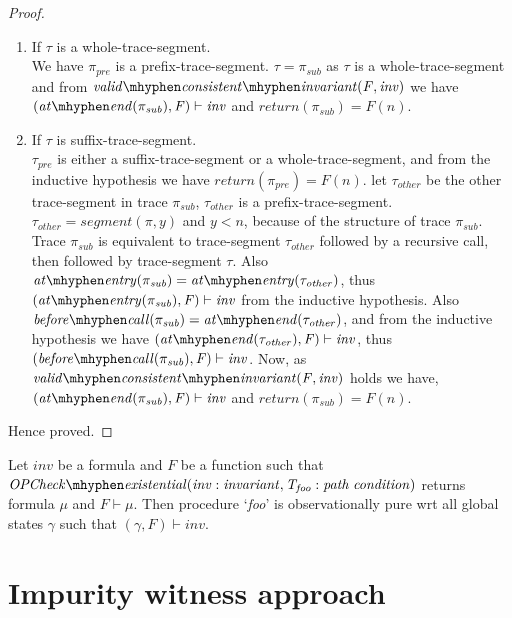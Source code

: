 \documentclass{llncs}
\newcommand{\foo}{\textit{foo}}
\newcommand{\trace}{\pi}
\newcommand{\inv}{\mathit{inv}}
\newcommand{\pathCondition}{\mathit{T_{\foo}}}
\newcommand{\OPCheckE}{\mathit{OPCheck \mhyphen existential}}
\newcommand{\mi}[1]{\mathit{#1}}
\newcommand{\F}{\mathit{F}}
\newcommand{\n}{\textit{n}}
\newcommand{\gstate}{\gamma}
\newcommand{\satisfies}{\vdash}
\newcommand{\formula}{\mu}
\newcommand{\vci}[2]{\mathit{valid \mhyphen consistent \mhyphen
    invariant(#1, #2)}}
\newcommand{\atEntry}[1]{\mathit{at \mhyphen entry(#1)}}
\newcommand{\beforeCall}[1]{\mathit{before \mhyphen call(#1)}}
\newcommand{\return}[1]{\mathit{return(#1)}}
\newcommand{\atEnd}[1]{\mathit{at \mhyphen end(#1)}}
\newcommand{\tSegment}{\tau}
\newcommand{\subTrace}{\pi_{sub}}
\newcommand{\segment}[2]{\mathit{segment(#1, #2)}} %
\begin{document}
\begin{proof}
\begin{enumerate}
  \item If $\tSegment$ is a whole-trace-segment.\\
    We have $\trace_{pre}$ is a prefix-trace-segment. $\tSegment =
    \subTrace$ as $\tSegment$ is a whole-trace-segment and from
    $\vci{\F}{\inv}$ we have \\$(\atEnd{\subTrace}, \F) \satisfies \inv$
    and $\return{\subTrace} = \F(\n)$.

  \item If $\tSegment$ is suffix-trace-segment.\\
    $\tSegment_{pre}$ is either a suffix-trace-segment or a
    whole-trace-segment, and from the
    inductive hypothesis we have $\return{\trace_{pre}} = \F(\n)$. let
    $\tSegment_{other}$ be the other trace-segment in trace
    $\subTrace$, $\tSegment_{other}$ is a
    prefix-trace-segment. $\tSegment_{other} = \segment{\trace}{y}$
    and $y < n$, because of the structure of trace $\subTrace$. Trace
    $\subTrace$ is equivalent to trace-segment $\tSegment_{other}$ followed by a
    recursive call, then followed by trace-segment $\tSegment$.  Also
    $\atEntry{\subTrace} = \atEntry{\tSegment_{other}}$, thus
    $(\atEntry{\subTrace}, \F)
    \satisfies \inv$ from the inductive hypothesis. Also
    $\beforeCall{\subTrace} = \atEnd{\tSegment_{other}}$, and from the
    inductive hypothesis we have $(\atEnd{\tSegment_{other}}, \F)
    \satisfies \inv$, thus $(\beforeCall{\subTrace}, \F)
    \satisfies \inv$. Now, as $\vci{\F}{\inv}$ holds we
    have, $(\atEnd{\subTrace}, \F) \satisfies \inv$ and
    $\return{\subTrace} = \F(\n)$.
  \end{enumerate}
  
  Hence proved.
\end{proof}

\begin{theorem} \label{theorem:swopGivesWop}
  Let $\inv$ be a formula and $\F$ be a function such that
  \\$\OPCheckE\mi{(\inv : invariant, \pathCondition : path \;
    condition)}$ returns formula $\formula$ and $\F \satisfies
  \formula$. Then procedure `\foo' is observationally pure wrt all
  global states $\gstate$ such that $(\gstate, \F) \satisfies \inv$.
\end{theorem}


\section{Impurity witness approach}\label{sec:impurityWitness}
\end{document}

